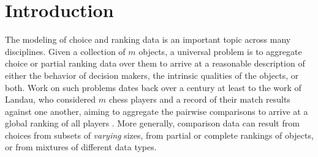 \section{Introduction}
The modeling of choice and ranking data is an important topic across many disciplines. Given a collection of $m$ objects, a universal problem is to aggregate choice or partial ranking data over them to arrive at a reasonable description of either the behavior of decision makers,  the intrinsic qualities of the objects, or both. Work on such problems dates back over a century at least to the work of Landau, who considered $m$ chess players and a record of their match results against one another, aiming to aggregate the pairwise comparisons to arrive at a
global ranking of all players \citep{landau1895relativen,elo1978rating}. More generally, comparison data can result from choices from subsets of \emph{varying} sizes, from partial or complete rankings of objects, or from mixtures of different data types.

